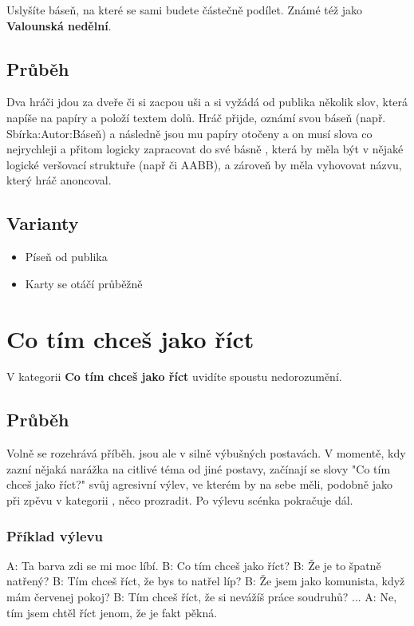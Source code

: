 \documentclass[main.tex]{subfiles}
\begin{document}
 
Uslyšíte báseň, na které se sami budete částečně podílet. 
Známé též jako \textbf{Valounská nedělní}{}. 
 
\subsection{Průběh} Dva hráči jdou za dveře či si zacpou uši a  si vyžádá od publika několik slov, která napíše na papíry a položí textem dolů. 
Hráč přijde, oznámí svou báseň (např. Sbírka:Autor:Báseň) a následně jsou mu papíry otočeny a on musí slova co nejrychleji a přitom logicky zapracovat do své básně , 
která by měla být v nějaké logické veršovací struktuře (např  či AABB), a zároveň by měla vyhovovat názvu, který hráč anoncoval. 
 
 
\subsection{ Varianty } \begin{itemize}
\item Píseň od publika
\item Karty se otáčí průběžně
\end{itemize}
 
 
 
 
\needspace{5cm} \section{Co tím chceš jako říct} \label{co tím chceš jako říct}  
 
V kategorii \textbf{Co tím chceš jako říct}{} uvidíte spoustu nedorozumění. 
 
 
\subsection{ Průběh } Volně se rozehrává příběh.  jsou ale v silně výbušných postavách. V momentě, kdy zazní nějaká narážka na citlivé téma od jiné postavy, začínají se slovy "Co tím chceš jako říct?"{} svůj agresivní výlev, ve kterém by na sebe měli, podobně jako při zpěvu v kategorii , něco prozradit. Po výlevu scénka pokračuje dál. 
 
\subsubsection{ Příklad výlevu } A: Ta barva zdi se mi moc líbí. 
B: Co tím chceš jako říct? 
B: Že je to špatně natřený? 
B: Tím chceš říct, že bys to natřel líp? 
B: Že jsem jako komunista, když mám červenej pokoj? 
B: Tím chceš říct, že si nevážíš práce soudruhů? 
... 
A: Ne, tím jsem chtěl říct jenom, že je fakt pěkná. 
 
\end{document}
